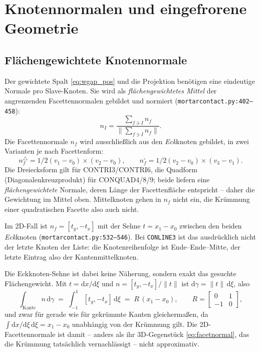 \documentclass[a4paper,11pt]{article}
\def\bm#1{#1}%
\def\tfrac#1#2{#1/#2}%
\newcommand{\code}[1]{\texttt{\small #1}}
\newcommand{\file}[1]{\texttt{\small #1}}
\let\stdsection\section
\renewcommand{\section}{\clearpage\stdsection}
\begin{document}
\section{Knotennormalen und eingefrorene Geometrie}
\label{sec:normalen}

\subsection{Flächengewichtete Knotennormale}
Der gewichtete Spalt \eqref{eq:wgap_pos} und die Projektion benötigen eine eindeutige Normale pro
Slave-Knoten. Sie wird als \emph{flächengewichtetes Mittel} der angrenzenden Facettennormalen gebildet
und normiert (\file{mortarcontact.py:\allowbreak{}402--458}):
\begin{equation}
\bm n_I = \frac{\sum_{f\ni I}\bm n_f}{\big\|\sum_{f\ni I}\bm n_f\big\|} .
\end{equation}
Die Facettennormale $\bm n_f$ wird ausschließlich aus den \emph{Eck}knoten gebildet, in zwei
Varianten je nach Facettenform:
\begin{equation}
\bm n_f^{\triangle} = \tfrac12(\bm v_1-\bm v_0)\times(\bm v_2-\bm v_0),
\qquad
\bm n_f^{\square} = \tfrac12(\bm v_2-\bm v_0)\times(\bm v_3-\bm v_1) .
\label{eq:facetnormal}
\end{equation}
Die Dreiecksform gilt für CONTRI3/CONTRI6, die Quadform (Diagonalenkreuzprodukt) für
CONQUAD4/8/9; beide liefern eine \emph{flächengewichtete} Normale, deren Länge der Facettenfläche
entspricht -- daher die Gewichtung im Mittel oben. Mittelknoten gehen in $\bm n_f$ nicht ein, die
Krümmung einer quadratischen Facette also auch nicht.

Im 2D-Fall ist $\bm n_f=[t_y,-t_x]$ mit der Sehne $\bm t=\bm x_1-\bm x_0$ zwischen den beiden
\emph{Eck}knoten (\file{mortarcontact.py:\allowbreak{}532--546}). Bei \code{CONLINE3} ist das
ausdrücklich nicht der letzte Knoten der Liste: die Knotenreihenfolge ist Ende--Ende--Mitte, der
letzte Eintrag also der Kantenmittelknoten.

Die Eckknoten-Sehne ist dabei keine Näherung, sondern exakt das gesuchte Flächengewicht. Mit
$\bm t=\mathrm d\bm x/\mathrm d\xi$ und $\bm n=[t_y,-t_x]/\|\bm t\|$ ist $\mathrm d\gamma =
\|\bm t\|\,\mathrm d\xi$, also
\begin{equation}
\int_{\text{Kante}} \bm n\,\mathrm d\gamma \;=\; \int_{-1}^{1}[t_y,-t_x]\,\mathrm d\xi
\;=\; \bm R\,(\bm x_1-\bm x_0),
\qquad \bm R=\begin{bmatrix}0&1\\-1&0\end{bmatrix},
\label{eq:linefacetnormal}
\end{equation}
und zwar für gerade wie für gekrümmte Kanten gleichermaßen, da
$\int \mathrm d\bm x/\mathrm d\xi\,\mathrm d\xi = \bm x_1-\bm x_0$ unabhängig von der Krümmung
gilt. Die 2D-Facettennormale ist damit -- anders als ihr 3D-Gegenstück
\eqref{eq:facetnormal}, das die Krümmung tatsächlich vernachlässigt -- nicht approximativ.
\end{document}
